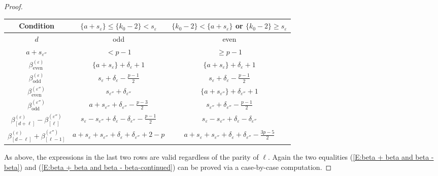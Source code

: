 \documentclass[12pt]{amsart}
\theoremstyle{definition}
\numberwithin{equation}{subsection}
\newcommand{\even}{\mathrm{even}}
\newcommand{\odd}{\mathrm{odd}}
\begin{document}
\begin{proof}
\begin{center}
\begin{tabular}{|c|c|c|}
\hline
Condition & $\{a+s_\varepsilon\}\leq  \{k_0-2\} < s_\varepsilon$ &$\{k_0-2\}< \{a+s_\varepsilon\} $ or $\{k_0-2\} \geq s_\varepsilon$
\\
\hline 
$d$ &  odd & even
\\ 
\hline
$a+ s_{\varepsilon''}$  & $< p-1$&  $\geq p-1$
\\
\hline 
$\beta^{(\varepsilon)}_\even$ & $\{a+s_\varepsilon\} + \delta_\varepsilon+1$& $\{a+s_\varepsilon\} + \delta_\varepsilon+1$
\\
\hline 
$\beta^{(\varepsilon)}_\odd$ & $s_\varepsilon + \delta_\varepsilon - \frac{p-1}2$ & $s_\varepsilon + \delta_\varepsilon - \frac{p-1}2$
\\
\hline 
$\beta^{(\varepsilon'')}_\even$ & $s_{\varepsilon''} + \delta_{\varepsilon''}$ & $\{a+s_{\varepsilon''}\}  + \delta_{\varepsilon''}+1$
\\
\hline 
$\beta^{(\varepsilon'')}_\odd$&$a+s_{\varepsilon''} + \delta_{\varepsilon''} - \frac{p-3}2$ & $s_{\varepsilon''} + \delta_{\varepsilon''} -\frac{p-1}2$
\\
\hline  $\beta_{[d+\ell]}^{(\varepsilon)} - \beta_{[\ell]}^{(\varepsilon'')}$ & $s_\varepsilon -s_{\varepsilon''} +  \delta_\varepsilon - \delta_{\varepsilon''} -\frac{p-1}2$ & $s_\varepsilon - s_{\varepsilon''} + \delta_{\varepsilon } - \delta_{\varepsilon''}$
\\
\hline
$\beta_{[d-\ell]}^{(\varepsilon)} + \beta_{[\ell-1]}^{(\varepsilon'')}$  & $a+  s_\varepsilon + s_{\varepsilon''} + \delta_\varepsilon + \delta_{\varepsilon ''} +2-p$ & $a+  s_\varepsilon + s_{\varepsilon''} + \delta_\varepsilon + \delta_{\varepsilon ''} -\frac{3p-5}2$
\\
\hline
\end{tabular}
\end{center}
As above, the expressions in the last two rows are valid regardless of the parity of $\ell$. Again the two equalities (\ref{E:beta + beta and beta - beta}) and (\ref{E:beta + beta and beta - beta-continued}) can be proved via a case-by-case computation.
\end{proof}
\end{document}
